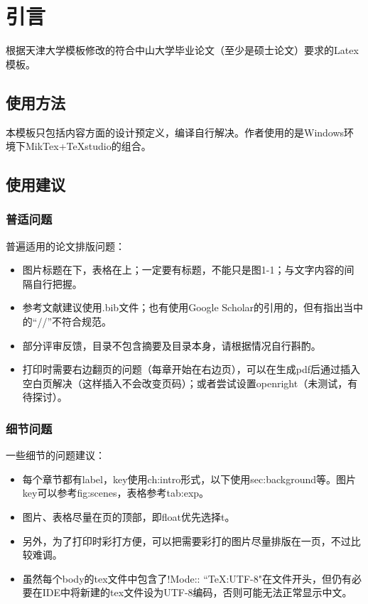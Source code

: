 
\chapter{引言}
\label{ch:intro}

根据天津大学模板修改的符合中山大学毕业论文（至少是硕士论文）要求的Latex模板。

\section{使用方法}
\label{sec:usage}

本模板只包括内容方面的设计预定义，编译自行解决。作者使用的是Windows环境下MikTex+TeXstudio的组合。

\section{使用建议}
\label{sec:tips}

\subsection{普适问题}
\label{subsec:common}

普遍适用的论文排版问题：

\begin{itemize}
\item 图片标题在下，表格在上；一定要有标题，不能只是图1-1；与文字内容的间隔自行把握。
\item 参考文献建议使用.bib文件；也有使用Google Scholar的引用的，但有指出当中的“//”不符合规范。
\item 部分评审反馈，目录不包含摘要及目录本身，请根据情况自行斟酌。
\item 打印时需要右边翻页的问题（每章开始在右边页），可以在生成pdf后通过插入空白页解决（这样插入不会改变页码）；或者尝试设置openright（未测试，有待探讨）。
\end{itemize}

\subsection{细节问题}
\label{subsec:specs}

一些细节的问题建议：
\begin{itemize}
\item 每个章节都有label，key使用ch:intro形式，以下使用sec:background等。图片key可以参考fig:scenes，表格参考tab:exp。
\item 图片、表格尽量在页的顶部，即float优先选择t。
\item 另外，为了打印时彩打方便，可以把需要彩打的图片尽量排版在一页，不过比较难调。
\item 虽然每个body的tex文件中包含了!Mode:: ``TeX:UTF-8"在文件开头，但仍有必要在IDE中将新建的tex文件设为UTF-8编码，否则可能无法正常显示中文。
\end{itemize}

